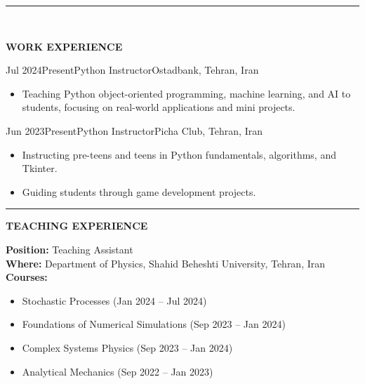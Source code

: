 \documentclass[11pt, b4paper]{cv}
\begin{document}
\pagebreak
\rule{\textwidth}{1pt}\\
\vspace{-0.15in}

\textbf{WORK EXPERIENCE}

\begin{work}{Jul 2024}{Present}{Python Instructor}{Ostadbank, Tehran, Iran}
	\begin{itemize}
		\item Teaching Python object-oriented programming, machine learning, and AI to students, focusing on real-world applications and mini projects.
	\end{itemize}
\end{work}

\vspace{-0.1in}

\begin{work}{Jun 2023}{Present}{Python Instructor}{Picha Club, Tehran, Iran}
	\begin{itemize}
		\item Instructing pre-teens and teens in Python fundamentals, algorithms, and Tkinter.
		\item Guiding students through game development projects.
	\end{itemize}
\end{work}

\vspace{-0.15in}
\rule{\textwidth}{1pt}
\vspace{-0.15in}

\textbf{TEACHING EXPERIENCE}

\textbf{Position:} Teaching Assistant\\
\textbf{Where:} \hspace{0.1in}Department of Physics, Shahid Beheshti University, Tehran, Iran\\
\textbf{Courses:}
\begin{itemize}
	\item Stochastic Processes (Jan 2024 – Jul 2024)
	\item Foundations of Numerical Simulations (Sep 2023 – Jan 2024)
	\item Complex Systems Physics (Sep 2023 – Jan 2024)
	\item Analytical Mechanics (Sep 2022 – Jan 2023)
\end{itemize}    
\end{document}
